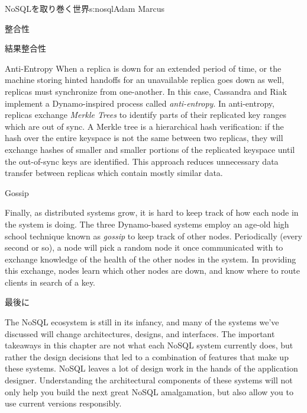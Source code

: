 \begin{aosachapter}{NoSQLを取り巻く世界}{s:nosql}{Adam Marcus}
\begin{aosasect1}{整合性}
\begin{aosasect2}{結果整合性}
\begin{aosasect3}{Anti-Entropy}
When a replica is down for an extended period of time, or the machine
storing hinted handoffs for an unavailable replica goes down as well,
replicas must synchronize from one-another.  In this case, Cassandra
and Riak implement a Dynamo-inspired process called
\emph{anti-entropy}.  In anti-entropy, replicas exchange \emph{Merkle
Trees} to identify parts of their replicated key ranges which are
out of sync.  A Merkle tree is a hierarchical hash verification: if
the hash over the entire keyspace is not the same between two
replicas, they will exchange hashes of smaller and smaller portions of
the replicated keyspace until the out-of-sync keys are identified.
This approach reduces unnecessary data transfer between replicas which
contain mostly similar data.

\end{aosasect3}

\begin{aosasect3}{Gossip}

Finally, as distributed systems grow, it is hard to keep track of how
each node in the system is doing.  The three Dynamo-based systems
employ an age-old high school technique known as \emph{gossip} to keep
track of other nodes.  Periodically (every second or so), a node will
pick a random node it once communicated with to exchange knowledge of
the health of the other nodes in the system.  In providing this
exchange, nodes learn which other nodes are down, and know where to
route clients in search of a key.

\end{aosasect3}

\end{aosasect2}

\end{aosasect1}

\begin{aosasect1}{最後に}

The NoSQL ecosystem is still in its infancy, and many of the
systems we've discussed will change architectures, designs, and
interfaces.  The important takeaways in this chapter are not what
each NoSQL system currently does, but rather the design decisions that
led to a combination of features that make up these systems.  NoSQL
leaves a lot of design work in the hands of the application designer.
Understanding the architectural components of these systems will not
only help you build the next great NoSQL amalgamation, but also allow
you to use current versions responsibly.


\end{aosasect1}
\end{aosachapter}
